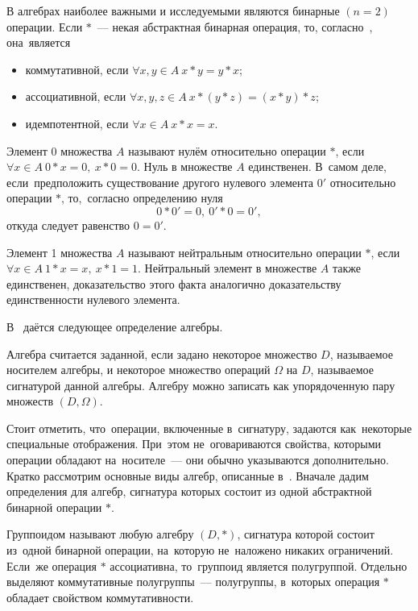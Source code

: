 В алгебрах наиболее важными и исследуемыми являются бинарные $\left( n=2 \right)$ операции. Если $*$~--- некая абстрактная бинарная операция, то, согласно~\cite{Bauman_DM}, она~является
\begin{itemize}
	\item коммутативной, если $\forall x,y\in A\ x*y=y*x$;
	\item ассоциативной, если $\forall x,y,z\in A\ x*\left( y*z \right)=\left( x*y \right)*z$;
	\item идемпотентной, если $\forall x\in A\ x*x=x$.
\end{itemize}

Элемент $0$ множества $A$ называют нулём относительно операции $*$, если $\forall x\in A\ 0*x=0,\ x*0=0$. Нуль в множестве $A$ единственен. В~самом деле, если~предположить существование другого нулевого элемента ${0}'$ относительно операции $*$, то,~согласно определению нуля
\begin{equation*}
	0*{0}'=0,\ {0}'*0={0}',
\end{equation*}
откуда следует равенство $0={0}'$.

Элемент 1 множества $A$ называют нейтральным относительно операции $*$, если $\forall x\in A\ 1*x=x,\ x*1=1$.
Нейтральный элемент в множестве $A$ также единственен, доказательство этого факта аналогично доказательству единственности нулевого элемента.

В~\cite{Bauman_DM, Adelson_Velskiy} даётся следующее определение алгебры.
\begin{mydef}
Алгебра считается заданной, если задано некоторое множество $D$, называемое носителем алгебры, и некоторое множество операций $\Omega $ на $D$, называемое сигнатурой данной алгебры. Алгебру можно записать как упорядоченную пару множеств $\left( D,\Omega  \right)$.
\end{mydef}

Стоит отметить, что~операции, включенные в~сигнатуру, задаются как~некоторые специальные отображения. При~этом не~оговариваются свойства, которыми операции обладают на~носителе~--– они обычно указываются дополнительно.
Кратко рассмотрим основные виды алгебр, описанные в~\cite{Bauman_DM, Adelson_Velskiy, Voevodin}. Вначале дадим определения для алгебр, сигнатура которых состоит из одной абстрактной бинарной операции $*$.

Группоидом называют любую алгебру $\left( D,* \right)$, сигнатура которой состоит из~одной бинарной операции, на~которую не~наложено никаких ограничений. Если~же операция $*$ ассоциативна, то~группоид является полугруппой. Отдельно выделяют коммутативные полугруппы~--– полугруппы, в~которых операция $*$ обладает свойством коммутативности.

